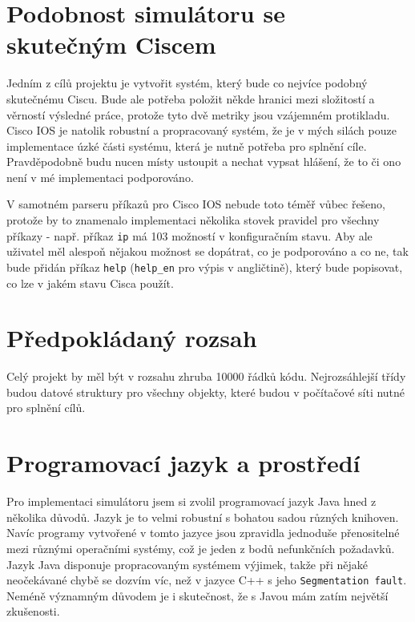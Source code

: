 
\section{Podobnost simulátoru se skutečným Ciscem}\label{kap:podobnost}
Jedním z cílů projektu je vytvořit systém, který bude co nejvíce podobný skutečnému Ciscu. Bude ale potřeba položit někde hranici mezi složitostí a věrností výsledné práce, protože tyto dvě metriky jsou vzájemném protikladu. Cisco IOS je natolik robustní a propracovaný systém, že je v mých silách pouze implementace úzké části systému, která je nutně potřeba pro splnění cíle. Pravděpodobně budu nucen místy ustoupit a nechat vypsat hlášení, že to či ono není v mé implementaci podporováno. 

V samotném parseru příkazů pro Cisco IOS nebude toto téměř vůbec řešeno, protože by to znamenalo implementaci několika stovek pravidel pro všechny příkazy - např. příkaz \verb|ip| má 103 možností v konfiguračním stavu. Aby ale uživatel měl alespoň nějakou možnost se dopátrat, co je podporováno a co ne, tak bude přidán příkaz \verb|help| (\verb|help_en| pro výpis v angličtině), který bude popisovat, co lze v jakém stavu Cisca použít.


\section{Předpokládaný rozsah}
Celý projekt by měl být v rozsahu zhruba 10000 řádků kódu. Nejrozsáhlejší třídy budou datové struktury pro všechny objekty, které budou v počítačové síti nutné pro splnění cílů.


\section{Programovací jazyk a prostředí}
Pro implementaci simulátoru jsem si zvolil programovací jazyk Java hned z několika důvodů. Jazyk je to velmi robustní s bohatou sadou různých knihoven. Navíc programy vytvořené v tomto jazyce jsou zpravidla jednoduše přenositelné mezi různými operačními systémy, což je jeden z bodů nefunkčních požadavků. Jazyk Java disponuje propracovaným systémem výjimek, takže při nějaké neočekávané chybě se dozvím víc, než v jazyce C++ s jeho \verb|Segmentation fault|. Neméně významným důvodem je i skutečnost, že s Javou mám zatím největší zkušenosti.

